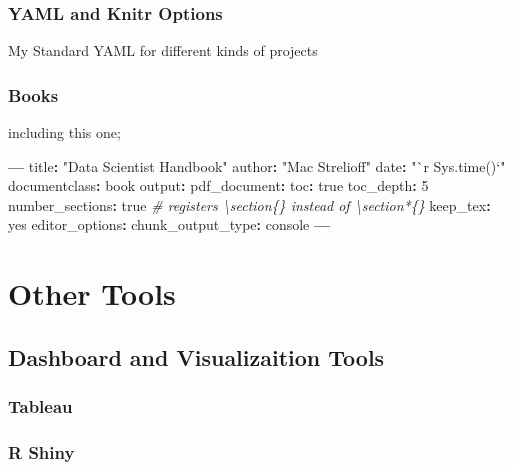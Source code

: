 \documentclass[]{article}
\newenvironment{Shaded}{\begin{snugshade}}{\end{snugshade}}
\newcommand{\DecValTok}[1]{\textcolor[rgb]{0.00,0.00,0.81}{#1}}
\newcommand{\StringTok}[1]{\textcolor[rgb]{0.31,0.60,0.02}{#1}}
\newcommand{\CommentTok}[1]{\textcolor[rgb]{0.56,0.35,0.01}{\textit{#1}}}
\newcommand{\OperatorTok}[1]{\textcolor[rgb]{0.81,0.36,0.00}{\textbf{#1}}}
\newcommand{\NormalTok}[1]{#1}
\begin{document}
\section{YAML and Knitr Options}

My Standard YAML for different kinds of projects

\section*{Books}

including this one;

\begin{Shaded}
\begin{Highlighting}[]
\OperatorTok{---}
\NormalTok{title}\OperatorTok{:}\StringTok{ "Data Scientist Handbook"}
\NormalTok{author}\OperatorTok{:}\StringTok{ "Mac Strelioff"}
\NormalTok{date}\OperatorTok{:}\StringTok{ "`r Sys.time()`"}
\NormalTok{documentclass}\OperatorTok{:}\StringTok{ }\NormalTok{book}
\NormalTok{output}\OperatorTok{:}\StringTok{ }
\StringTok{ }\NormalTok{pdf_document}\OperatorTok{:}
\StringTok{    }\NormalTok{toc}\OperatorTok{:}\StringTok{ }\NormalTok{true}
\NormalTok{    toc_depth}\OperatorTok{:}\StringTok{ }\DecValTok{5}
\NormalTok{    number_sections}\OperatorTok{:}\StringTok{ }\NormalTok{true }\CommentTok{# registers \textbackslash{}section\{\} instead of \textbackslash{}section*\{\}}
\NormalTok{    keep_tex}\OperatorTok{:}\StringTok{ }\NormalTok{yes}
\NormalTok{editor_options}\OperatorTok{:}\StringTok{ }
\StringTok{  }\NormalTok{chunk_output_type}\OperatorTok{:}\StringTok{ }\NormalTok{console}
\OperatorTok{---}
\end{Highlighting}
\end{Shaded}

\part{Other Tools}

\chapter{Dashboard and Visualizaition Tools}

\section{Tableau}

\section{R Shiny}
\end{document}
